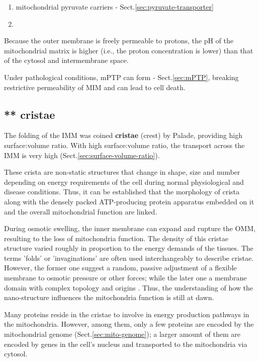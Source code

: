 \begin{enumerate}
  \item mitochondrial pyruvate carriers -  Sect.\ref{sec:pyruvate-transporter}

  \item
\end{enumerate}

Because the outer membrane is freely permeable to protons, the pH of the
mitochondrial matrix is higher (i.e., the proton concentration is lower) than
that of the cytosol and intermembrane space.


Under pathological conditions, mPTP can form - Sect.\ref{sec:mPTP}, breaking
restrictive permeability of MIM and can lead to cell death.


\subsection{** cristae}
\label{sec:cristae}

The folding of the IMM was coined {\bf cristae} (crest) by Palade, providing
high surface:volume ratio.  With high surface:volume ratio, the transport across
the IMM is very high  (Sect.\ref{sec:surface-volume-ratio}).

These crista are non-static structures that change in shape, size and number
depending on energy requirements of the cell during normal physiological and
disease conditions. Thus, it can be established that the morphology of crista
along with the densely packed ATP-producing protein apparatus embedded on it and
the overall mitochondrial function are linked.

During osmotic swelling, the inner membrane can expand and rupture the OMM,
resulting to the loss of mitochondria function. The density of this cristae
structure varied roughly in proportion to the energy demands of the tissues. The
terms 'folds' or 'invaginations' are often used interchangeably to describe
cristae. However, the former one suggest a random, passive adjustment of a
flexible membrane to osmotic pressure or other forces; while the later one a
membrane domain with complex topology and origins \citep{mannella2013}. Thus,
the understanding of how the nano-structure influences the mitochondria function
is still at dawn.


Many proteins reside in the cristae to involve in energy production pathways in
the mitochondria. However, among them, only a few proteins are encoded by
the mitochondrial genome (Sect.\ref{sec:mito-genome}); a larger amount of them
are encoded by genes in the cell's nucleus and transported to the mitochondria via cytosol.

